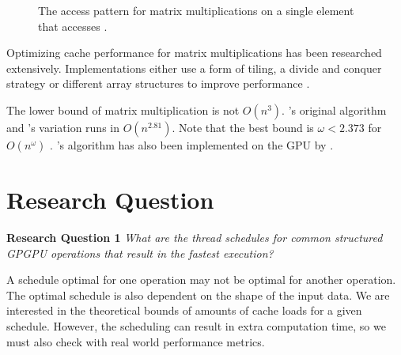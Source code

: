 \documentclass{article}
\begin{document}
\begin{figure}[h]
    \centering
    \qquad

    \caption{
        The access pattern for matrix multiplications on a single element  that accesses .
    }
    \label{fig:matmult_access_pattern}
\end{figure}

Optimizing cache performance for matrix multiplications has been researched extensively.
Implementations either use a form of tiling, a divide and conquer strategy or different array structures to improve performance \cite{bader2006cache,frigo1999cache}.

The lower bound of matrix multiplication is not $O(n^3)$.
\citet{strassen1969gaussian}'s original algorithm and \citet{winograd1971multiplication}'s variation runs in $O(n^{2.81})$.
Note that the best bound is $\omega < 2.373$ for $O(n^\omega)$ \cite{alman2018limits}.
\citeauthor{strassen1969gaussian}'s algorithm has also been implemented on the GPU by \citet{li2011strassen}.

\section{Research Question}

\begin{mdframed}
    \textbf{Research Question 1}
    \emph{What are the thread schedules for common structured GPGPU operations that result in the fastest execution?}
\end{mdframed}
A schedule optimal for one operation may not be optimal for another operation.
The optimal schedule is also dependent on the shape of the input data.
We are interested in the theoretical bounds of amounts of cache loads for a given schedule.
However, the scheduling can result in extra computation time, so we must also check with real world performance metrics.
\end{document}
